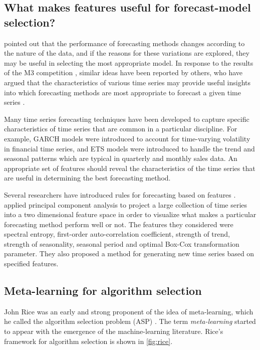 \documentclass[11pt,a4paper,]{article}
\theoremstyle{definition}
\theoremstyle{definition}
\theoremstyle{definition}
\theoremstyle{remark}
\begin{document}
\subsection{What makes features useful for forecast-model
selection?}\label{what-makes-features-useful-for-forecast-model-selection}

\textcite{reid1972comparison} pointed out that the performance of
forecasting methods changes according to the nature of the data, and if
the reasons for these variations are explored, they may be useful in
selecting the most appropriate model. In response to the results of the
M3 competition \autocite{makridakis2000m3}, similar ideas have been
reported by others, who have argued that the characteristics of various
time series may provide useful insights into which forecasting methods
are most appropriate to forecast a given time series
\autocites{hyndman2001s}{lawrence2001s}{armstrong2001s}.

Many time series forecasting techniques have been developed to capture
specific characteristics of time series that are common in a particular
discipline. For example, GARCH models were introduced to account for
time-varying volatility in financial time series, and ETS models were
introduced to handle the trend and seasonal patterns which are typical
in quarterly and monthly sales data. An appropriate set of features
should reveal the characteristics of the time series that are useful in
determining the best forecasting method.

Several researchers have introduced rules for forecasting based on
features \autocites{collopy1992rule}{adya2001automatic}{wang2009rule}.
\textcite{kang2017visualising} applied principal component analysis to
project a large collection of time series into a two dimensional feature
space in order to visualize what makes a particular forecasting method
perform well or not. The features they considered were spectral entropy,
first-order auto-correlation coefficient, strength of trend, strength of
seasonality, seasonal period and optimal Box-Cox transformation
parameter. They also proposed a method for generating new time series
based on specified features.

\subsection{Meta-learning for algorithm
selection}\label{meta-learning-for-algorithm-selection}

John Rice was an early and strong proponent of the idea of
meta-learning, which he called the algorithm selection problem (ASP)
\autocite{rice1976}. The term \emph{meta-learning} started to appear
with the emergence of the machine-learning literature. Rice's framework
for algorithm selection is shown in \autoref{fig:rice}.
\end{document}
